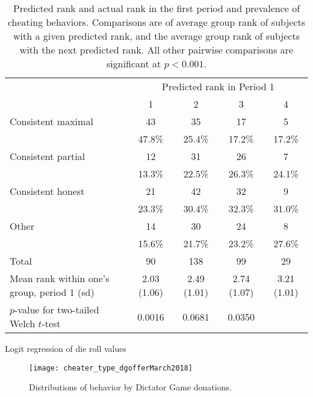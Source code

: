 \documentclass[12pt]{article}
\begin{document}
\begin{table}[ht]
\begin{center}
\begin{tabular}{|p{8cm}|cccc|}
\hline
&\multicolumn{4}{c|}{Predicted rank in Period 1}\\
&1&2&3&4\\
\hline
Consistent maximal&   43    	&     35  	&       17  &        5 \\
                  &    47.8\%	&  25.4\%	&   17.2\% &   17.2\%\\ 
Consistent partial&        12  	&       31  &       26 &         7 \\
                  &     13.3\%	&     22.5\%&      26.3\%&      24.1\% \\
 Consistent honest&        21 	&        42 &    32 &         9\\
                  &     23.3\%	&    30.4\%	&      32.3\%&      31.0\% \\
             Other&        14   &     30   	&      24   &       8\\
                  &     15.6\%	&    21.7\%	&     23.2\%&      27.6\%\\
\hline
Total  		&        90  &      138  &       99  &       29\\
Mean rank within one's group, period 1 (sd)&  2.03  (1.06)&	2.49  (1.01)&  2.74 (1.07) & 3.21 (1.01) \\
 $p$-value for two-tailed Welch $t$-test& 0.0016&0.0681&0.0350&\\
\hline
\end{tabular}
\end{center}
\caption{Predicted rank and actual rank in the first period and prevalence of cheating behaviors. Comparisons are of average group rank of subjects with a given predicted rank, and the average group rank of subjects with the next predicted rank. All other pairwise comparisons are significant at $p<0.001$.}
\label{table:init_pred}
\end{table}

\begin{table}[ht]
\begin{center}
\small

\end{center}
\caption{Logit regression of die roll values}
\label{table_dieroll_pred}
\end{table}


\begin{figure}[!htb]
\centerline{\texttt{[image: cheater\_type\_dgofferMarch2018]}}
\caption{Distributions of behavior by Dictator Game donations.}\label{fig:ind_typenew2_dg0}
\end{figure}
\end{document}
